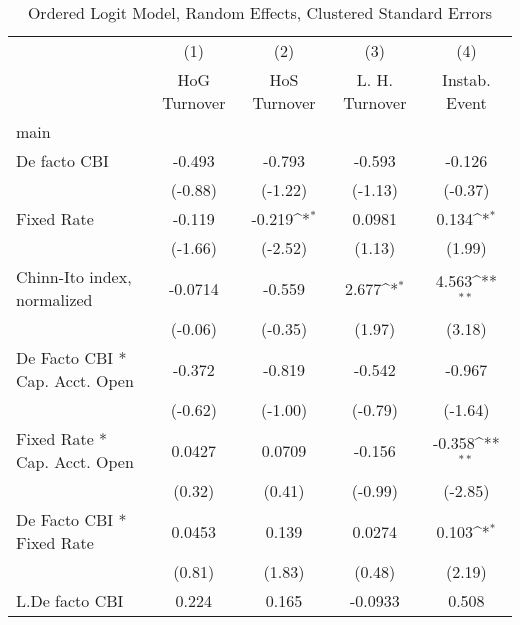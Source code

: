 {
\def\sym#1{\ifmmode^{#1}\else\(^{#1}\)\fi}
\begin{longtable}{l*{4}{c}}
\caption{Ordered Logit Model, Random Effects, Clustered Standard Errors \label{kapintlagordLogLogDF}}\\
\hline\hline\endfirsthead\hline\endhead\hline\endfoot\endlastfoot
                &\multicolumn{1}{c}{(1)}&\multicolumn{1}{c}{(2)}&\multicolumn{1}{c}{(3)}&\multicolumn{1}{c}{(4)}\\
                &\multicolumn{1}{c}{HoG Turnover}&\multicolumn{1}{c}{HoS Turnover}&\multicolumn{1}{c}{L. H. Turnover}&\multicolumn{1}{c}{Instab. Event}\\
\hline
main            &                  &                  &                  &                  \\
De facto CBI    &   -0.493         &   -0.793         &   -0.593         &   -0.126         \\
                &  (-0.88)         &  (-1.22)         &  (-1.13)         &  (-0.37)         \\
[1em]
Fixed Rate      &   -0.119         &   -0.219\sym{*}  &   0.0981         &    0.134\sym{*}  \\
                &  (-1.66)         &  (-2.52)         &   (1.13)         &   (1.99)         \\
[1em]
Chinn-Ito index, normalized&  -0.0714         &   -0.559         &    2.677\sym{*}  &    4.563\sym{**} \\
                &  (-0.06)         &  (-0.35)         &   (1.97)         &   (3.18)         \\
[1em]
De Facto CBI * Cap. Acct. Open&   -0.372         &   -0.819         &   -0.542         &   -0.967         \\
                &  (-0.62)         &  (-1.00)         &  (-0.79)         &  (-1.64)         \\
[1em]
Fixed Rate * Cap. Acct. Open&   0.0427         &   0.0709         &   -0.156         &   -0.358\sym{**} \\
                &   (0.32)         &   (0.41)         &  (-0.99)         &  (-2.85)         \\
[1em]
De Facto CBI * Fixed Rate&   0.0453         &    0.139         &   0.0274         &    0.103\sym{*}  \\
                &   (0.81)         &   (1.83)         &   (0.48)         &   (2.19)         \\
[1em]
L.De facto CBI  &    0.224         &    0.165         &  -0.0933         &    0.508         \\

\end{longtable}}
